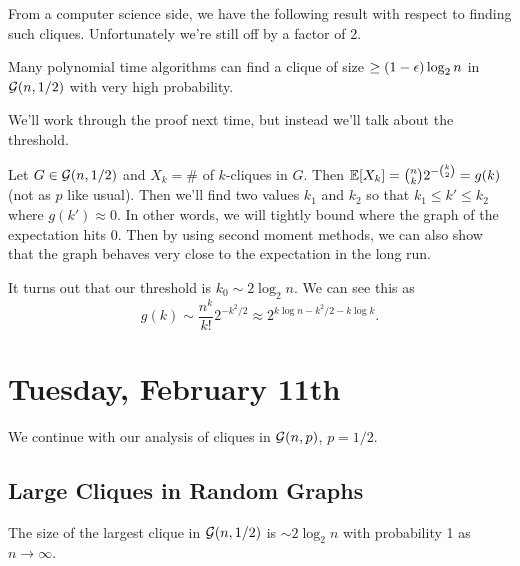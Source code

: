 \documentclass[11 pt]{scrartcl}
\begin{document}
From a computer science side, we have the following result with respect to finding such cliques. Unfortunately we're still off by a factor of 2.  
\begin{fact}
    Many polynomial time algorithms can find a clique of size $\geq (1-\epsilon)\log_2 n$ in $\mathcal G(n, 1/2)$ with very high probability. 
\end{fact}

We'll work through the proof next time, but instead we'll talk about the threshold. 

Let $G \in \mathcal G(n, 1/2)$ and $X_k = \#$ of $k$-cliques in $G$. Then $\mathbb E[X_k] = \binom{n}{k}2^{-\binom{k}{2}} = g(k)$ (not as $p$ like usual). Then we'll find two values $k_1$ and $k_2$ so that $k_1 \leq k' \leq k_2$ where $g(k') \approx 0$. In other words, we will tightly bound where the graph of the expectation hits 0. Then by using second moment methods, we can also show that the graph behaves very close to the expectation in the long run. 

It turns out that our threshold is $k_0 \sim 2\log_2 n$. We can see this as 
\[ g(k) \sim \dfrac{n^k}{k!} 2^{-k^2/2} \approx 2^{k\log n - k^2/2 - k\log k}.\] 

\newpage
\section{Tuesday, February 11th}
We continue with our analysis of cliques in $\mathcal G(n, p)$, $p = 1/2$.

\subsection{Large Cliques in Random Graphs}

\begin{theorem}
    The size of the largest clique in $\mathcal G(n, 1/2)$ is $\sim 2\log_2 n$ with probability 1 as $n\to\infty$. 
\end{theorem}
\end{document}
